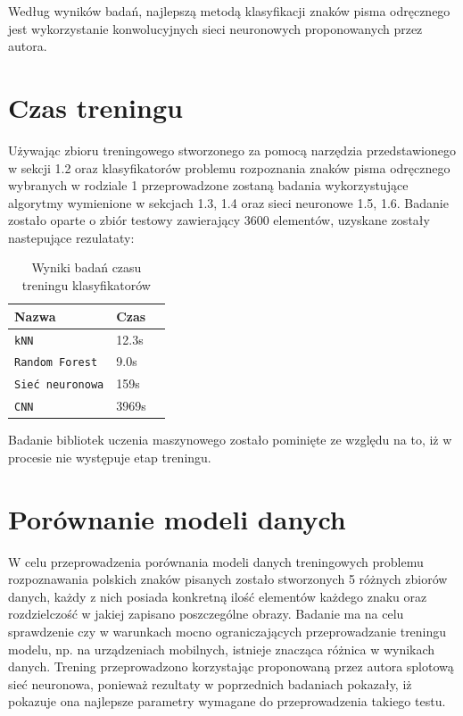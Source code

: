 \documentclass[brudnopis]{xmgr}
\begin{document}
Według wyników badań, najlepszą metodą klasyfikacji znaków pisma odręcznego jest wykorzystanie konwolucyjnych sieci neuronowych proponowanych przez autora.

\section{Czas treningu}

Używając zbioru treningowego stworzonego za pomocą narzędzia przedstawionego w sekcji 1.2 oraz klasyfikatorów problemu rozpoznania znaków pisma odręcznego wybranych w rodziale 1 przeprowadzone zostaną badania wykorzystujące algorytmy wymienione w sekcjach 1.3, 1.4 oraz sieci neuronowe 1.5, 1.6. Badanie zostało oparte o zbiór testowy zawierający 3600 elementów, uzyskane zostały nastepujące rezulataty: 

\begin{table}[!htb]
\begin{tabular}{|l|l|l|} \hline
Nazwa & Czas \\ \hline
\texttt{kNN} & 12.3s \\ \hline
\texttt{Random Forest} & 9.0s \\ \hline
\texttt{Sieć neuronowa} & 159s \\ \hline
\texttt{CNN}     & 3969s \\ \hline
\end{tabular}
\caption{Wyniki badań czasu treningu klasyfikatorów}
\end{table}

Badanie bibliotek uczenia maszynowego zostało pominięte ze względu na to, iż w procesie nie występuje etap treningu.

\section{Porównanie modeli danych}

W celu przeprowadzenia porównania modeli danych treningowych problemu rozpoznawania polskich znaków pisanych zostało stworzonych 5 różnych zbiorów danych, każdy z nich posiada konkretną ilość elementów każdego znaku oraz rozdzielczość w jakiej zapisano poszczególne obrazy. Badanie ma na celu sprawdzenie czy w warunkach mocno ograniczających przeprowadzanie treningu modelu, np. na urządzeniach mobilnych, istnieje znacząca różnica w wynikach danych. Trening przeprowadzono korzystając proponowaną przez autora splotową sieć neuronowa, ponieważ rezultaty w poprzednich badaniach pokazały, iż pokazuje ona najlepsze parametry wymagane do przeprowadzenia takiego testu.
\end{document}
